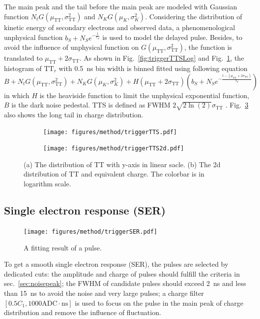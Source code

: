 The main peak and the tail before the main peak are modeled with Gaussian function $N_tG(\mu_{\mathrm{TT}},\sigma_{\mathrm{TT}}^2)$ and $N_KG(\mu_K,\sigma_K^2)$. Considering the distribution of kinetic energy of secondary electrons \cite{Furman,SecondElectron} and observed data, a phenomenological unphysical function $b_S+N_Se^{-\frac{t}{\tau_S}}$ is used to model the delayed pulse. Besides, to avoid the influence of unphysical function on $G(\mu_{\mathrm{TT}},\sigma_{\mathrm{TT}}^2)$, the function is translated to $\mu_{\mathrm{TT}}+2\sigma_{\mathrm{TT}}$.  As shown in Fig.~\ref{fig:triggerTTSLog} and Fig.~\ref{fig:triggerTTS}, the histogram of $\mathrm{TT}_r$ with \SI{0.5}{ns} bin width is binned fitted using following equation
\begin{equation}
    B+N_tG(\mu_{\mathrm{TT}},\sigma_{\mathrm{TT}}^2)+N_KG(\mu_K,\sigma_K^2)+H(\mu_{\mathrm{TT}}+2\sigma_{\mathrm{TT}})\left(b_S+N_Se^{-\frac{t-(\mu_{\mathrm{TT}}+2\sigma_{\mathrm{TT}})}{\tau_S}}\right)
\end{equation}
in which $H$ is the heaviside function to limit the unphysical exponential function, $B$ is the dark noise pedestal. TTS is defined as FWHM $2\sqrt{2\ln(2)}\sigma_{\mathrm{TT}}$ \cite{HAMAMATSUManual}. Fig.~\ref{fig:triggerTTS2d} also shows the long tail in charge distribution.

\begin{figure}[!htbp]
    \centering
    \begin{subfigure}[t]{\SF\textwidth}
        \texttt{[image: figures/method/triggerTTS.pdf]}
        \caption{}%
        \label{fig:triggerTTS}
    \end{subfigure}
    \begin{subfigure}[t]{\SF\textwidth}
        \texttt{[image: figures/method/triggerTTS2d.pdf]}
        \caption{}%
        \label{fig:triggerTTS2d}
    \end{subfigure}
    \caption{(a) The distribution of TT with y-axis in linear sacle. (b) The 2d distribution of TT and equivalent charge. The colorbar is in logarithm scale.}
\end{figure}

\subsection{Single electron response (SER)}
\begin{figure}
    \centering
    \texttt{[image: figures/method/triggerSER.pdf]}
    \caption{A fitting result of a pulse.}
    \label{fig:triggerser}
\end{figure}
To get a smooth single electron response (SER), the pulses are selected by dedicated cuts: the amplitude and charge of pulses should fulfill the criteria in sec.~\ref{sec:noisepeak}; the FWHM of candidate pulses should exceed \SI{2}{ns} and less than \SI{15}{ns} to avoid the noise and very large pulses; a charge filter $[0.5C_1, 1000\mathrm{ADC\cdot ns}]$ is used to focus on the pulse in the main peak of charge distribution and remove the influence of fluctuation.

